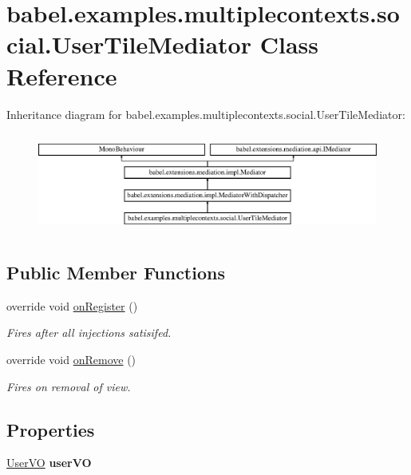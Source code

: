 \hypertarget{classbabel_1_1examples_1_1multiplecontexts_1_1social_1_1_user_tile_mediator}{\section{babel.\-examples.\-multiplecontexts.\-social.\-User\-Tile\-Mediator Class Reference}
\label{classbabel_1_1examples_1_1multiplecontexts_1_1social_1_1_user_tile_mediator}
}
Inheritance diagram for babel.\-examples.\-multiplecontexts.\-social.\-User\-Tile\-Mediator\-:\begin{figure}[H]
\begin{center}
\leavevmode
\includegraphics[height=3.333333cm]{classbabel_1_1examples_1_1multiplecontexts_1_1social_1_1_user_tile_mediator}
\end{center}
\end{figure}
\subsection*{Public Member Functions}
\begin{DoxyCompactItemize}
\item 
override void \hyperlink{classbabel_1_1examples_1_1multiplecontexts_1_1social_1_1_user_tile_mediator_abadbfed0bf1ee19d65a8e08747c28f9d}{on\-Register} ()
\begin{DoxyCompactList}\small\item\em Fires after all injections satisifed. \end{DoxyCompactList}\item 
override void \hyperlink{classbabel_1_1examples_1_1multiplecontexts_1_1social_1_1_user_tile_mediator_a31023b75317372308d69e25b2e4ee290}{on\-Remove} ()
\begin{DoxyCompactList}\small\item\em Fires on removal of view. \end{DoxyCompactList}\end{DoxyCompactItemize}
\subsection*{Properties}
\begin{DoxyCompactItemize}
\item 
\hypertarget{classbabel_1_1examples_1_1multiplecontexts_1_1social_1_1_user_tile_mediator_a8cc0be84cdc30b9827612f826c6ac5e8}{\hyperlink{classbabel_1_1examples_1_1multiplecontexts_1_1social_1_1_user_v_o}{User\-V\-O} {\bfseries user\-V\-O}}\label{classbabel_1_1examples_1_1multiplecontexts_1_1social_1_1_user_tile_mediator_a8cc0be84cdc30b9827612f826c6ac5e8}

\end{DoxyCompactItemize}

